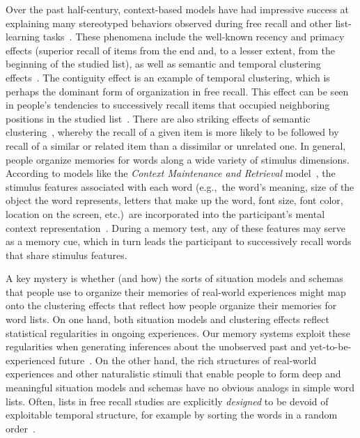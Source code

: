 \documentclass[11pt]{article}
\begin{document}
Over the past half-century, context-based models have had impressive success at
explaining many stereotyped behaviors observed during free recall and other
list-learning tasks~\citep{Este55a, RaaiShif80, GlenEtal83, HowaKaha02a,
SiroEtal05, KimbEtal07, PolyKaha08, SedeEtal08, PolyEtal09, ShanHowa12}. These
phenomena include the well-known recency and primacy effects (superior recall
of items from the end and, to a lesser extent, from the beginning of the
studied list), as well as semantic and temporal clustering
effects~\citep{KahaEtal08b, HowaKaha02b}. The contiguity effect is an example
of temporal clustering, which is perhaps the dominant form of organization in
free recall. This effect can be seen in people's tendencies to successively
recall items that occupied neighboring positions in the studied
list~\citep{Kaha96}. There are also striking effects of semantic
clustering~\citep{RomnEtal93, Bous53, BousEtal54, JenkRuss52, MannKaha12},
whereby the recall of a given item is more likely to be followed by recall of a
similar or related item than a dissimilar or unrelated one. In general, people
organize memories for words along a wide variety of stimulus dimensions.
According to models like the \textit{Context Maintenance and Retrieval}
model~\citep{PolyEtal09}, the stimulus features associated with each word
(e.g.,\ the word's meaning, size of the object the word represents, letters
that make up the word, font size, font color, location on the screen, etc.)~are
incorporated into the participant's mental context
representation~\citep{SmitVela01, MannEtal11, MannEtal12, MannEtal15, Mann20}.
During a memory test, any of these features may serve as a memory cue, which in
turn leads the participant to successively recall words that share stimulus
features.


A key mystery is whether (and how) the sorts of situation models and schemas
that people use to organize their memories of real-world experiences might map
onto the clustering effects that reflect how people organize their memories for
word lists. On one hand, both situation models and clustering effects reflect
statistical regularities in ongoing experiences. Our memory systems exploit
these regularities when generating inferences about the unobserved past and
yet-to-be-experienced future~\citep{XuEtal23, SchaTurk15, RangRitc12,
BoweEtal79, MomeEtal17}. On the other hand, the rich structures of real-world
experiences and other naturalistic stimuli that enable people to form deep and
meaningful situation models and schemas have no obvious analogs in simple word
lists. Often, lists in free recall studies are explicitly \textit{designed} to
be devoid of exploitable temporal structure, for example by sorting the words
in a random order~\citep{Kaha12}.
\end{document}

